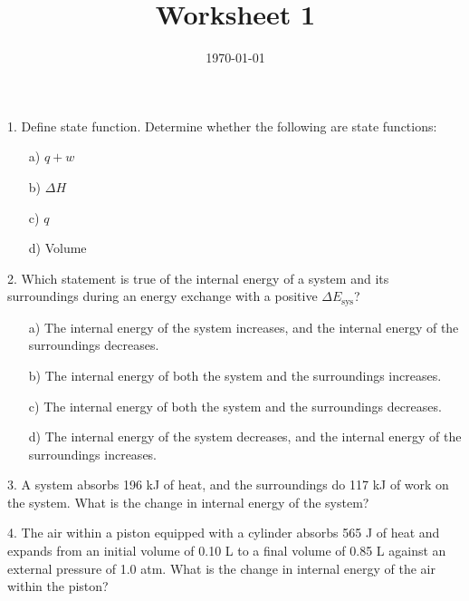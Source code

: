 \documentclass[11pt]{article}
\title{\textbf{Worksheet 1}}
\date{\vspace{-2em}\today}
\begin{document}
\maketitle


1. Define state function. Determine whether the following are state functions:
\begin{enumerate}
\item[a)] $q + w$ %
\item[b)] $\Delta H$ %
\item[c)] $q$ %
\item[d)] Volume %
\end{enumerate}

2. Which statement is true of the internal energy of a system and its
surroundings during an energy exchange with a positive $\Delta E_\text{sys}$?
\begin{enumerate}
\item[a)] The internal energy of the system increases, and the internal
  energy of the surroundings decreases.
\item[b)] The internal energy of both the system and the surroundings
  increases.
\item[c)] The internal energy of both the system and the surroundings
  decreases.
\item[d)] The internal energy of the system decreases, and the internal
  energy of the surroundings increases.
\end{enumerate}

3. A system absorbs 196 kJ of heat, and the surroundings do 117 kJ
of work on the system. What is the change in internal energy of
the system?

\vspace{1in}

4. The air within a piston equipped with a cylinder absorbs 565 J of 
heat and expands from an initial volume of 0.10 L to a final volume of
 0.85 L against an external pressure of 1.0 atm. What is the change in
 internal energy of the air within the piston?
\end{document}
